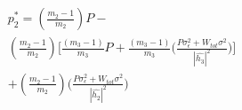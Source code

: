 \documentclass[preview]{standalone}
\begin{document}
\begin{align*}
p_2^\ast = \left(\frac{m_2 - 1}{m_2}\right) P - \\ \left(\frac{m_2 - 1}{m_2}\right) \Bigg[ \frac{\left(m_3 - 1\right)}{m_3} P + \frac{\left(m_3 - 1\right)}{m_3} \Bigg( \frac{P \sigma_\epsilon^2 + W_{tot} \sigma^2 }{ \left| \hat{h_3} \right| ^2 } \Bigg) \Bigg] \\ + \left(\frac{m_2 - 1}{m_2}\right) \Bigg( \frac{P \sigma_\epsilon^2 + W_{tot} \sigma^2}{\left|\hat{h_2}\right|^2} \Bigg)
\end{align*}
\end{document}
